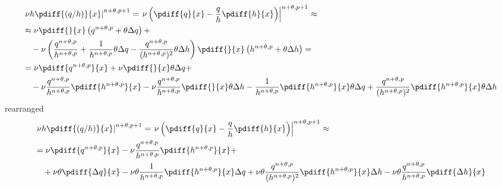 \begin{align}
    &\left. \nu h \pdiff{(q/h)}{x} \right|^{n+\theta, p+1}  = \left. \nu \left(\pdiff{q}{x} - \frac{q}{h} \pdiff{h}{x} \right) \right|^{n+\theta, p+1} \approx
    \\
    & \approx \nu \pdiff{}{x} \left( q^{n+\theta, p} + \theta\Delta q  \right) +
    \\
    & \quad - \nu \left( \frac{q^{n+\theta, p}}{h^{n+\theta, p}} + \frac{1}{h^{n+\theta, p}}\theta\Delta q - \frac{q^{n+\theta, p}}{(h^{n+\theta, p})^2}\theta\Delta h   \right) \pdiff{}{x} \left( h^{n+\theta, p} + \theta\Delta h  \right) =
    \\
    & = \nu \pdiff{ q^{n+\theta, p}}{x}  + \nu \pdiff{}{x} \theta \Delta q +
    \\
    & \quad - \nu \frac{q^{n+\theta, p}}{h^{n+\theta, p}} \pdiff{h^{n+\theta, p}}{x} - \nu \frac{q^{n+\theta, p}}{h^{n+\theta, p}}\pdiff{}{x} \theta\Delta h - \frac{1}{h^{n+\theta, p}}\pdiff{h^{n+\theta, p}}{x} \theta\Delta q + \frac{q^{n+\theta, p}}{(h^{n+\theta, p})^2} \pdiff{h^{n+\theta, p}}{x} \theta\Delta h
\end{align}
rearranged
\begin{align}
    &\left. \nu h \pdiff{(q/h)}{x} \right|^{n+\theta, p+1}
    = \left. \nu \left(\pdiff{q}{x} - \frac{q}{h} \pdiff{h}{x} \right) \right|^{n+\theta, p+1} \approx
\\
    & = \nu \pdiff{ q^{n+\theta, p}}{x} - \nu \frac{q^{n+\theta, p}}{h^{n+\theta, p}} \pdiff{h^{n+\theta, p}}{x}  +
\\
    & \quad
    + \nu \theta \pdiff{\Delta q}{x}
    - \nu \theta \frac{1}{h^{n+\theta, p}}\pdiff{h^{n+\theta, p}}{x} \Delta q
    + \nu \theta \frac{q^{n+\theta, p}}{(h^{n+\theta, p})^2} \pdiff{h^{n+\theta, p}}{x} \Delta h
    - \nu \theta \frac{q^{n+\theta, p}}{h^{n+\theta, p}}\pdiff{\Delta h}{x}
\end{align}
